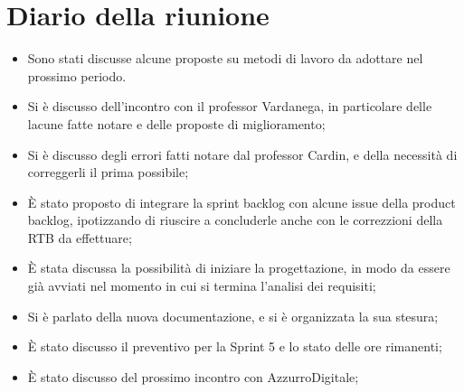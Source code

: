 
\section{Diario della riunione}

\begin{itemize}
    \item Sono stati discusse alcune proposte su metodi di lavoro da adottare nel prossimo periodo.
    \item Si è discusso dell'incontro con il professor Vardanega, in particolare delle lacune fatte notare e delle proposte di miglioramento;
    \item Si è discusso degli errori fatti notare dal professor Cardin, e della necessità di correggerli il prima possibile;
    \item È stato proposto di integrare la sprint backlog con alcune issue della product backlog, ipotizzando di riuscire a concluderle anche con le correzzioni della RTB da effettuare;
    \item È stata discussa la possibilità di iniziare la progettazione, in modo da essere già avviati nel momento in cui si termina l'analisi dei requisiti;
    \item Si è parlato della nuova documentazione, e si è organizzata la sua stesura;
    \item È stato discusso il preventivo per la Sprint 5 e lo stato delle ore rimanenti;
    \item È stato discusso del prossimo incontro con AzzurroDigitale;
 \end{itemize}
